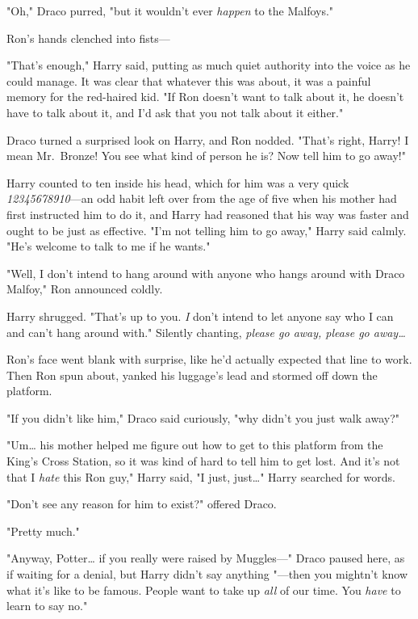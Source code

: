 "Oh," Draco purred, "but it wouldn't ever \emph{happen} to the Malfoys."

Ron's hands clenched into fists---

"That's enough," Harry said, putting as much quiet authority into the voice as 
he could manage. It was clear that whatever this was about, it was a painful 
memory for the red-haired kid. "If Ron doesn't want to talk about it, he 
doesn't have to talk about it, and I'd ask that you not talk about it either."

Draco turned a surprised look on Harry, and Ron nodded. "That's right, Harry! I 
mean Mr.~Bronze! You see what kind of person he is? Now tell him to go away!"

Harry counted to ten inside his head, which for him was a very quick 
\emph{12345678910}---an odd habit left over from the age of five when his 
mother had first instructed him to do it, and Harry had reasoned that his way 
was faster and ought to be just as effective. "I'm not telling him to go away," 
Harry said calmly. "He's welcome to talk to me if he wants."

"Well, I don't intend to hang around with anyone who hangs around with Draco 
Malfoy," Ron announced coldly.

Harry shrugged. "That's up to you. \emph{I} don't intend to let anyone say who 
I can and can't hang around with." Silently chanting, \emph{please go away, 
please go away{\ldots}}

Ron's face went blank with surprise, like he'd actually expected that line to 
work. Then Ron spun about, yanked his luggage's lead and stormed off down the 
platform.

"If you didn't like him," Draco said curiously, "why didn't you just walk away?"

"Um{\ldots} his mother helped me figure out how to get to this platform from 
the King's Cross Station, so it was kind of hard to tell him to get lost. And 
it's not that I \emph{hate} this Ron guy," Harry said, "I just, just{\ldots}" 
Harry searched for words.

"Don't see any reason for him to exist?" offered Draco.

"Pretty much."

"Anyway, Potter{\ldots} if you really were raised by Muggles---" Draco paused 
here, as if waiting for a denial, but Harry didn't say anything "---then you 
mightn't know what it's like to be famous. People want to take up \emph{all} of 
our time. You \emph{have} to learn to say no."


